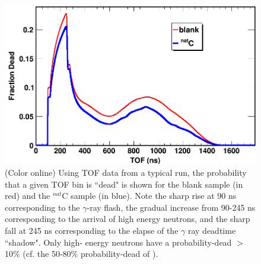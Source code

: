 \documentclass[twocolumn,secnumarabic,amssymb, nobibnotes, aps, prl,
superscriptaddress, nobalancelastpage]{revtex4}
\begin{document}
\begin{figure}
    \includegraphics[scale=0.3]{figures/exampleDeadtimeSpectrum.png}
    \caption{(Color online) Using TOF data from a typical run, the probability that a given 
        TOF bin is ``dead" is shown for the blank sample (in red) and the $^{nat}$C sample 
        (in blue). Note the sharp rise at 90 ns corresponding to the
        $\gamma$-ray flash, the gradual increase from 90-245 ns corresponding to
        the arrival of high energy neutrons, and the sharp fall at 245 ns
        corresponding to the elapse of the $\gamma$ ray deadtime ``shadow". Only high-
        energy neutrons have a probability-dead $>$10\% (cf. the 50-80\%
        probability-dead of \cite{Finlay1993, Abfalterer2001}).
    }
    \label{ExampleDeadtimeSpectrum}
\end{figure}
\end{document}

